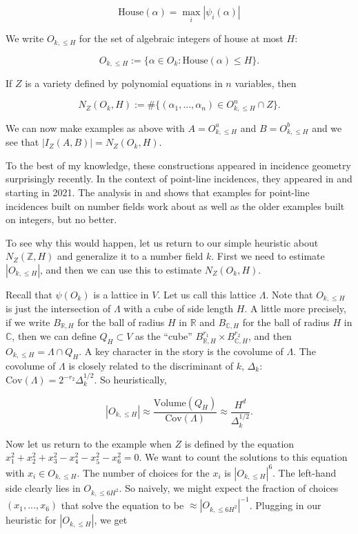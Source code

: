 \documentclass{amsart}
\newcommand{\CC}{\mathbb{C}}
\newcommand{\ZZ}{\mathbb{Z}}
\newcommand{\RR}{\mathbb{R}}
\newcommand{\house}{\textrm{House}}
\newcommand{\heur}{\approx}
\newcommand{\Volume}{\textrm{Volume}}
\newcommand{\Cov}{\textrm{Cov}}
\begin{document}
\begin{equation} \label{defhouse}
\house(\alpha) = \max_i |\psi_i(\alpha) |
\end{equation}

We write $O_{k, \le H}$ for the set of algebraic integers of house at most $H$:

$$O_{k,  \le H} := \{ \alpha \in O_k: \house(\alpha) \le H \}. $$

If $Z$ is a variety defined by polynomial equations in $n$ variables, then

$$N_Z(O_k, H) := \# \{ (\alpha_1, ..., \alpha_n) \in O_{k, \le H}^n \cap Z \}. $$

We can now make examples as above with $A = O_{k,\le H}^a$ and $B = O_{k, \le H}^b$ and we see that $|I_Z(A,B)| = N_Z(O_k, H)$.   

To the best of my knowledge, these constructions appeared in incidence geometry surprisingly recently.   In the context of point-line incidences,  they appeared in \cite{GS} and \cite{Cu} starting in 2021.   The analysis in \cite{GS} and \cite{Cu} shows that examples for point-line incidences built on number fields work about as well as the older examples built on integers, but no better.

To see why this would happen, let us return to our simple heuristic about $N_Z(\ZZ, H)$ and generalize it to a number field $k$.  First we need to estimate $|O_{k, \le H}|$, and then we can use this to estimate $N_Z(O_k, H)$.

Recall that $\psi(O_k)$ is a lattice in $V$.  Let us call this lattice $\Lambda$.  Note that $O_{k, \le H}$ is just the intersection of $\Lambda$ with a cube of side length $H$.   A little more precisely, if we write $B_{\RR, H}$ for the ball of radius $H$ in $\RR$ and $B_{\CC, H}$ for the ball of radius $H$ in $\CC$, then we can define $Q_H \subset V$ as the ``cube''  $B_{\RR, H}^{r_1} \times B_{\CC, H}^{r_2}$, and then  $O_{k, \le H} = \Lambda \cap Q_H$.  A key character in the story is the covolume of $\Lambda$.  The covolume of $\Lambda$ is closely related to the discriminant of $k$, $\Delta_k$: $ \Cov(\Lambda) = 2^{-r_2} \Delta_k^{1/2}. $   So heuristically, 

$$ |O_{k, \le H} | \heur \frac{\Volume(Q_H) }{\Cov(\Lambda)} \approx \frac{H^d}{\Delta_k^{1/2}}. $$

Now let us return to the example when $Z$ is defined by the equation $x_1^2 + x_2^2 + x_3^2 - x_4^2 - x_5^2 - x_6^2 = 0$.  We want to count the solutions to this equation with $x_i \in O_{k, \le H}$.  The number of choices for the $x_i$ is $|O_{k, \le H}|^6$.  The left-hand side clearly lies in $O_{k, \le 6H^2}$.  So naively, we might expect the fraction of choices $(x_1, ..., x_6)$ that solve the equation to be $\heur |O_{k, \le 6 H^2}|^{-1}$.  Plugging in our heuristic for $|O_{k, \le H}|$, we get
\end{document}
